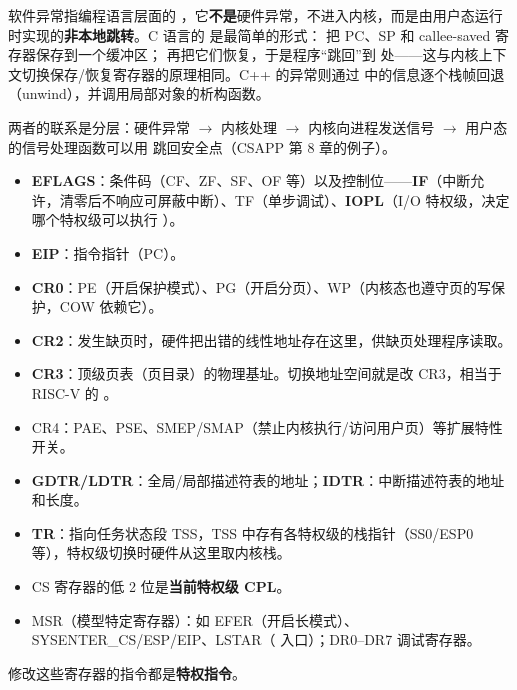 软件异常指编程语言层面的 ，它\textbf{不是}硬件异常，不进入内核，而是由用户态运行时实现的\textbf{非本地跳转}。C 语言的  是最简单的形式： 把 PC、SP 和 callee-saved 寄存器保存到一个缓冲区； 再把它们恢复，于是程序“跳回”到  处——这与内核上下文切换保存/恢复寄存器的原理相同。C++ 的异常则通过  中的信息逐个栈帧回退（unwind），并调用局部对象的析构函数。

两者的联系是分层：硬件异常 $\to$ 内核处理 $\to$ 内核向进程发送信号 $\to$ 用户态的信号处理函数可以用  跳回安全点（CSAPP 第 8 章的例子）。

\begin{itemize}
    \item \textbf{EFLAGS}：条件码（CF、ZF、SF、OF 等）以及控制位——\textbf{IF}（中断允许，清零后不响应可屏蔽中断）、TF（单步调试）、\textbf{IOPL}（I/O 特权级，决定哪个特权级可以执行 ）。
    \item \textbf{EIP}：指令指针（PC）。
    \item \textbf{CR0}：PE（开启保护模式）、PG（开启分页）、WP（内核态也遵守页的写保护，COW 依赖它）。
    \item \textbf{CR2}：发生缺页时，硬件把出错的线性地址存在这里，供缺页处理程序读取。
    \item \textbf{CR3}：顶级页表（页目录）的物理基址。切换地址空间就是改 CR3，相当于 RISC-V 的 。
    \item CR4：PAE、PSE、SMEP/SMAP（禁止内核执行/访问用户页）等扩展特性开关。
    \item \textbf{GDTR/LDTR}：全局/局部描述符表的地址；\textbf{IDTR}：中断描述符表的地址和长度。
    \item \textbf{TR}：指向任务状态段 TSS，TSS 中存有各特权级的栈指针（SS0/ESP0 等），特权级切换时硬件从这里取内核栈。
    \item CS 寄存器的低 2 位是\textbf{当前特权级 CPL}。
    \item MSR（模型特定寄存器）：如 EFER（开启长模式）、SYSENTER\_CS/ESP/EIP、LSTAR（ 入口）；DR0–DR7 调试寄存器。
\end{itemize}
修改这些寄存器的指令都是\textbf{特权指令}。


